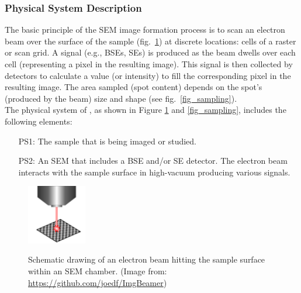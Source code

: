 \documentclass[12pt]{article}
\begin{document}
\subsubsection{Physical System Description} \label{sec_phySystDescrip}

The basic principle of the SEM image formation process is to scan an electron beam over the surface 
of the sample (fig.~\ref{fig_ebeam}) at discrete locations: cells of a raster or scan grid. A signal (e.g., BSEs, SEs) is 
produced as the beam dwells over each cell (representing a pixel in the resulting image). This 
signal is then collected by detectors to calculate a value (or intensity) to fill the corresponding
pixel in the resulting image. The area sampled (spot content) depends on the spot's (produced by the beam) size and 
shape (see fig.~\ref{fig_sampling}). \\

The physical system of \progname{}, as shown in Figure \ref{fig_ebeam} and \ref{fig_sampling},
includes the following elements:

\begin{itemize}

\item[PS1:] The sample that is being imaged or studied.

\item[PS2:] An SEM that includes a BSE and/or SE detector. The electron beam interacts with the sample surface in high-vacuum producing various signals.

\end{itemize}

\setlength{\belowcaptionskip}{-30pt}
\begin{figure}[h!]
\begin{center}
{
 \includegraphics[width=0.23\textwidth]{figures/e_beam.pdf}
}
\caption{\label{fig_ebeam} Schematic drawing of an electron beam hitting the sample surface within an SEM chamber. (Image from: \url{https://github.com/joedf/ImgBeamer})}
\end{center}
\end{figure}
\setlength{\belowcaptionskip}{10pt}
\end{document}
